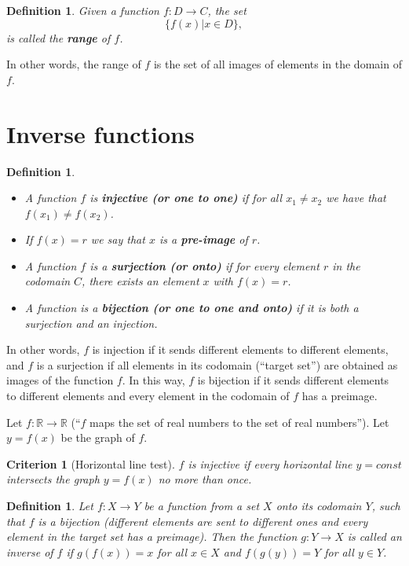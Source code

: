 \documentclass[12pt]{book}
\newtheorem{criterion}[theorem]{Criterion}
\newtheorem{definition}[theorem]{Definition}
\renewcommand{\emph}{\textbf}
\begin{document}
\begin{definition}
Given a function $f:D\to C$, the set
\[
 \{f(x) | x\in D \},
\]
is called the \emph{range} of $f$.
\end{definition}
In other words, the range of $f$ is the set of all images of elements in the domain of $f$.
\section{Inverse functions}

\begin{definition} ~
\begin{itemize}
\item {} A function $f$ is \emph{injective (or one to one)} if  for all $x_1\neq x_2$ we have that $f(x_1)\neq f(x_2)$.
\item {} If $f(x)=r$ we say that $x$ is a \emph{pre-image} of $r$.
\item {}
A function $f$ is a \emph{surjection (or onto)} if for every element $r$ in the codomain $C$, there exists an element $x$ with $f(x)=r$.
\item {} A function is a \emph{bijection (or one to one and onto)} if it is both a surjection and an injection.
\end{itemize}
\end{definition}
In other words, $f$ is injection if it sends different elements to different elements, and $f$ is a surjection if all elements in its  codomain (``target set'') are obtained as images of the function $f$. In this way, $f$ is bijection if it sends different elements to different elements and every element in the codomain of $f$ has a preimage.

Let $f: \mathbb R\to \mathbb R$ (``$f$ maps the set of real numbers to the set of real numbers''). Let $y=f(x)$ be the graph of $f$.
\begin{criterion}[Horizontal line test]
$f$ is injective if every horizontal line $y=const$ intersects the graph $y=f(x)$ no more than once.
\end{criterion}

\begin{definition}
Let $f:X\to Y$ be a function from a set $X$ onto its codomain $Y$, such that $f$ is a bijection (different elements are sent to different ones and every element in the target set has a preimage). Then the function $g: Y\to X$ is called an inverse of $f$ if $g(f(x))=x$ for all $x\in X$ and $f(g(y))=Y$ for all $y\in Y$.
\end{definition}
\end{document}
